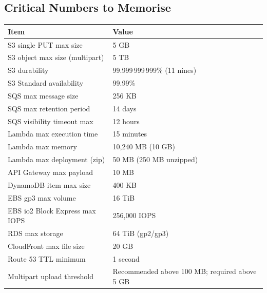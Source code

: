 

\subsection{Critical Numbers to Memorise}

\begin{comparebox}[title={Limits and numbers the exam loves to test}]
\begin{tabular}{@{}p{6.5cm}p{5cm}@{}}
\toprule
\textbf{Item} & \textbf{Value} \\
\midrule
S3 single PUT max size         & 5 GB \\
S3 object max size (multipart) & 5 TB \\
S3 durability                  & 99.999\,999\,999\% (11 nines) \\
S3 Standard availability       & 99.99\% \\
SQS max message size           & 256 KB \\
SQS max retention period       & 14 days \\
SQS visibility timeout max     & 12 hours \\
Lambda max execution time      & 15 minutes \\
Lambda max memory              & 10,240 MB (10 GB) \\
Lambda max deployment (zip)    & 50 MB (250 MB unzipped) \\
API Gateway max payload        & 10 MB \\
DynamoDB item max size         & 400 KB \\
EBS gp3 max volume             & 16 TiB \\
EBS io2 Block Express max IOPS & 256,000 IOPS \\
RDS max storage                & 64 TiB (gp2/gp3) \\
CloudFront max file size       & 20 GB \\
Route 53 TTL minimum           & 1 second \\
Multipart upload threshold     & Recommended above 100 MB; required above 5 GB \\
\bottomrule
\end{tabular}
\end{comparebox}

